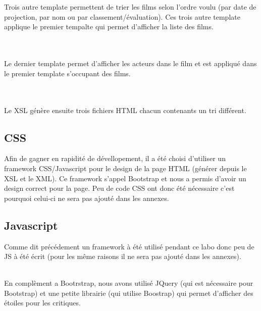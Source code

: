 \documentclass[french]{article}
\begin{document}
    \\\\Trois autre template permettent de trier les films
    selon l'ordre voulu (par date de projection, par nom ou par classement/évaluation).
    Ces trois autre template applique le premier tempalte qui permet d'afficher la
    liste des films.
    
    \vspace{30}

    \\\\Le dernier template permet d'afficher les acteurs dans le film et est appliqué
    dans le premier template s'occupant des films.
    
    \vspace{30}

    \\\\Le XSL génère ensuite trois fichiers HTML chacun contenants un tri différent.
    

    \subsection{CSS}
    Afin de gagner en rapidité de dévellopement, il a été choisi d'utiliser un
    framework CSS/Javascript pour le design de la page HTML (générer depuis le XSL et le XML).
    Ce framework s'appel Bootstrap et nous a permis d'avoir un design correct pour la page.
    Peu de code CSS ont donc été nécessaire c'est pourquoi celui-ci ne sera pas
    ajouté dans les annexes.

    \subsection{Javascript}
    Comme dit précédement un framework à été utilisé pendant ce labo donc peu de
    JS à été écrit (pour les même raisons il ne sera pas ajouté dans les annexes).

    \\ En complèment a Bootrstrap, nous avons utilisé JQuery (qui est nécessaire
    pour Bootstrap) et une petite librairie (qui utilise Boostrap) qui permet
    d'afficher des étoiles pour les critiques.

    \newpage
\end{document}
